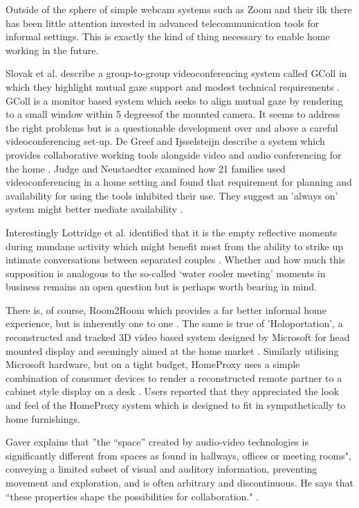 Outside of the sphere of simple webcam systems such as Zoom and their ilk there has been little attention invested in advanced telecommunication tools for informal settings. This is exactly the kind of thing necessary to enable home working in the future.\par
Slovak et al. describe a group-to-group videoconferencing system called GColl in which they highlight mutual gaze support and modest technical requirements \cite{Slovak2009}. GColl is a monitor based system which seeks to align mutual gaze by rendering to a small window within 5 degreesof the mounted camera. It seems to address the right problems but is a questionable development over and above a careful videoconferencing set-up. De Greef and Ijsselsteijn describe a system which provides collaborative working tools alongside video and audio conferencing for the home \cite{DeGreef2001}. Judge and Neustaedter examined how 21 families used videoconferencing in a home setting and found that requirement for planning and availability for using the tools inhibited their use. They suggest an 'always on' system might better mediate availability \cite{Judge2010}. \par
Interestingly Lottridge et al. identified that it is the empty reflective moments during mundane activity which might benefit most from the ability to strike up intimate conversations between separated couples \cite{Lottridge2009}. Whether and how much this supposition is analogous to the so-called `water cooler meeting' moments in business remains an open question but is perhaps worth bearing in mind.\par
There is, of course, Room2Room which provides a far better informal home experience, but is inherently one to one \cite{Pejsa2016}. The same is true of 'Holoportation', a reconstructed and tracked 3D video based system designed by Microsoft for head mounted display and seemingly aimed at the home market \cite{orts2016holoportation}. Similarly utilising Microsoft hardware, but on a tight budget, HomeProxy uses a simple combination of consumer devices to render a reconstructed remote partner to a cabinet style display on a desk \cite{Tang2013}. Users reported that they appreciated the look and feel of the HomeProxy system which is designed to fit in sympathetically to home furnishings.\par
Gaver explains that ''the “space” created by audio-video technologies is significantly different from spaces as found in hallways, offices or meeting rooms", conveying a limited subset of visual and auditory information, preventing movement and exploration, and is often arbitrary and discontinuous. He says that ``these properties shape the possibilities for collaboration." \cite{Gaver1992}.\par
